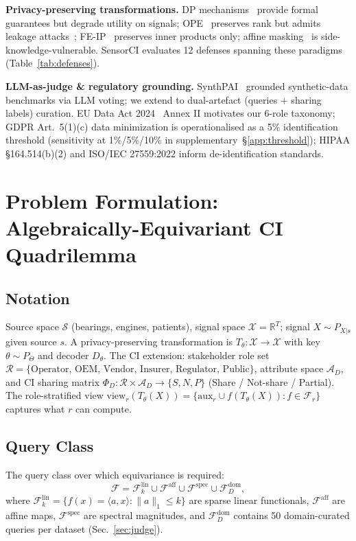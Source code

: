 \documentclass{article}
\theoremstyle{remark}
\newcommand{\R}{\mathbb{R}}
\newcommand{\view}{\mathrm{view}}
\begin{document}
\textbf{Privacy-preserving transformations.} DP mechanisms~\cite{dwork2006,abadi2016} provide formal guarantees but degrade utility on signals; OPE~\cite{boldyreva2009} preserves rank but admits leakage attacks~\cite{grubbs2017}; FE-IP~\cite{abdalla2015} preserves inner products only; affine masking~\cite{binfet2024} is side-knowledge-vulnerable. SensorCI evaluates 12 defenses spanning these paradigms (Table~\ref{tab:defenses}).

\textbf{LLM-as-judge \& regulatory grounding.} SynthPAI~\cite{synthpai} grounded synthetic-data benchmarks via LLM voting; we extend to dual-artefact (queries + sharing labels) curation. EU Data Act 2024~\cite{eu_data_act} Annex II motivates our 6-role taxonomy; GDPR Art.~5(1)(c) data minimization is operationalised as a 5\% identification threshold (sensitivity at 1\%/5\%/10\% in supplementary~\S\ref{app:threshold}); HIPAA \S 164.514(b)(2) and ISO/IEC 27559:2022 inform de-identification standards.

\section{Problem Formulation: Algebraically-Equivariant CI Quadrilemma}
\label{sec:framework}

\subsection{Notation}
Source space $\mathcal{S}$ (bearings, engines, patients), signal space $\mathcal{X} = \R^T$; signal $X \sim P_{X|s}$ given source $s$. A privacy-preserving transformation is $T_\theta: \mathcal{X} \to \mathcal{X}$ with key $\theta \sim P_\Theta$ and decoder $D_\theta$. The CI extension: stakeholder role set $\mathcal{R} = \{\text{Operator, OEM, Vendor, Insurer, Regulator, Public}\}$, attribute space $\mathcal{A}_D$, and CI sharing matrix $\Phi_D : \mathcal{R} \times \mathcal{A}_D \to \{S, N, P\}$ (Share / Not-share / Partial). The role-stratified view $\view_r(T_\theta(X)) = \{\text{aux}_r \cup f(T_\theta(X)) : f \in \mathcal{F}_r\}$ captures what $r$ can compute.

\subsection{Query Class}
The query class over which equivariance is required:
\[
\mathcal{F} = \mathcal{F}^{\text{lin}}_k \cup \mathcal{F}^{\text{aff}} \cup \mathcal{F}^{\text{spec}} \cup \mathcal{F}^{\text{dom}}_D,
\]
where $\mathcal{F}^{\text{lin}}_k = \{f(x) = \langle a, x \rangle : \|a\|_1 \le k\}$ are sparse linear functionals, $\mathcal{F}^{\text{aff}}$ are affine maps, $\mathcal{F}^{\text{spec}}$ are spectral magnitudes, and $\mathcal{F}^{\text{dom}}_D$ contains 50 domain-curated queries per dataset (Sec.~\ref{sec:judge}).
\end{document}

